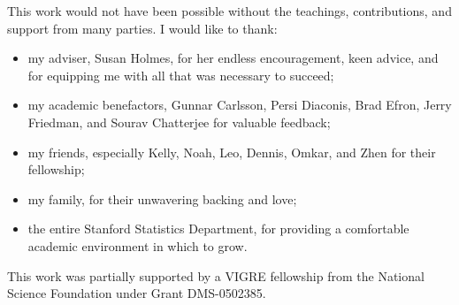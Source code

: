 
This work would not have been possible without the teachings,
contributions, and support from many parties.  I would like to thank:
\begin{itemize}
    \item my adviser, Susan Holmes, for her endless encouragement, keen advice,
      and for equipping me with all that was necessary to succeed;
    \item my academic benefactors, Gunnar Carlsson, Persi Diaconis, Brad Efron, Jerry Friedman,
      and Sourav Chatterjee for valuable feedback;
    \item my friends, especially Kelly, Noah, Leo, Dennis, Omkar, and
      Zhen for their fellowship;
    \item my family, for their unwavering backing and love;
    \item the entire Stanford Statistics Department, for providing a
      comfortable academic environment in which to grow.
\end{itemize}
This work was partially supported by a VIGRE fellowship from the
National Science Foundation under Grant DMS-0502385.